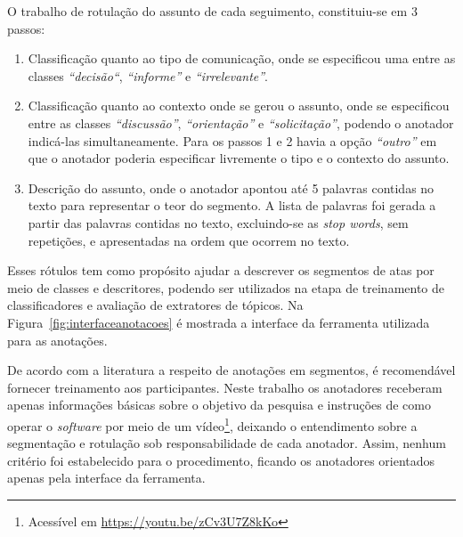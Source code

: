 O trabalho de rotulação do assunto de cada seguimento, constituiu-se em 3 passos:
\begin{enumerate}
	\item 

Classificação quanto ao tipo de comunicação, onde se especificou uma entre as classes 
\textit{``decisão``},
\textit{``informe''} e 
\textit{``irrelevante''}. 
	\item 
Classificação quanto ao contexto onde se gerou o assunto, onde se especificou entre as classes 
\textit{``discussão''},
\textit{``orientação''} e	
\textit{``solicitação''}, podendo o anotador indicá-las simultaneamente.
Para os passos 1 e 2 havia a opção \textit{``outro''} em que o anotador poderia especificar livremente o tipo e o contexto do assunto.
	\item 
		Descrição do assunto, onde o anotador apontou até 5 palavras contidas no texto para representar o teor do segmento. A lista de palavras foi gerada a partir das palavras contidas no texto, excluindo-se as \textit{stop words}, sem repetições, e apresentadas na ordem que ocorrem no texto.
\end{enumerate}
Esses rótulos tem como propósito ajudar a descrever os segmentos de atas por meio de classes e descritores, podendo ser utilizados na etapa de treinamento de classificadores e avaliação de extratores de tópicos.
Na Figura~\ref{fig:interfaceanotacoes} é mostrada a interface da ferramenta utilizada para as anotações.









De acordo com a literatura a respeito de anotações em segmentos, é recomendável fornecer treinamento aos participantes. Neste trabalho os anotadores receberam apenas informações básicas sobre o objetivo da pesquisa e instruções de como operar o \textit{software} por meio de um vídeo\footnote{Acessível em \url{https://youtu.be/zCv3U7Z8kKo}}, deixando o entendimento sobre a segmentação e rotulação sob responsabilidade de cada anotador. Assim, nenhum critério foi estabelecido para o procedimento, ficando os anotadores orientados apenas pela interface da ferramenta. 

